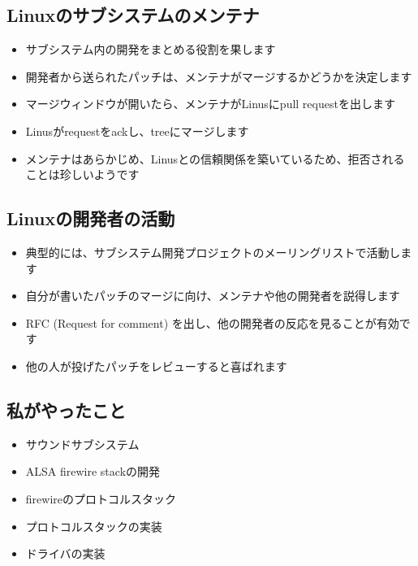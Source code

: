 \documentclass[mingoth,a4paper]{jsarticle}
\begin{document}
\subsection{Linuxのサブシステムのメンテナ}

\begin{itemize}
\itemsep1pt\parskip0pt
\item
  サブシステム内の開発をまとめる役割を果します
\item
  開発者から送られたパッチは、メンテナがマージするかどうかを決定します
\item
  マージウィンドウが開いたら、メンテナがLinusにpull requestを出します
\item
  Linusがrequestをackし、treeにマージします
\item
  メンテナはあらかじめ、Linusとの信頼関係を築いているため、拒否されることは珍しいようです
\end{itemize}

\subsection{Linuxの開発者の活動}

\begin{itemize}
\itemsep1pt\parskip0pt
\item
  典型的には、サブシステム開発プロジェクトのメーリングリストで活動します
\item
  自分が書いたパッチのマージに向け、メンテナや他の開発者を説得します
\item
  RFC (Request for comment) を出し、他の開発者の反応を見ることが有効です
\item
  他の人が投げたパッチをレビューすると喜ばれます
\end{itemize}

\subsection{私がやったこと}

\begin{itemize}
\itemsep1pt\parskip0pt
\item
  サウンドサブシステム
\item
  ALSA firewire stackの開発
\item
  firewireのプロトコルスタック
\item
  プロトコルスタックの実装
\item
  ドライバの実装
\end{itemize}
\end{document}
